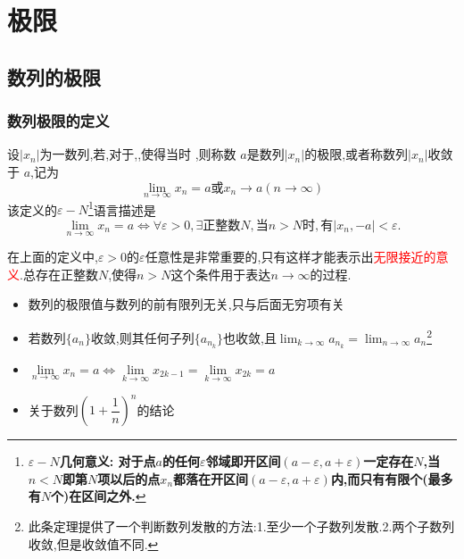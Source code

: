 \documentclass[10pt, a4paper, oneside, UTF8]{ctexbook}
\begin{document}
\begin{sloppypar}
    \else
    \fi
    \chapter{极限}
    \section{数列的极限}
    \subsection{数列极限的定义}
    \begin{defn}{}{}
        设$|x_n|$为一数列,若,对于,,使得当时 ,则称数 $a$是数列$| x_n |$的极限,或者称数列$| x_n |$收敛于 $a$,记为
        $$
            \lim_{n\to\infty}x_n=a\text{或}x_n\to a(n\to\infty)
        $$
        该定义的$\varepsilon-N$\footnote{$\varepsilon - N$\textbf{几何意义: 对于点$a$的任何$\varepsilon$邻域即开区间$(a-\varepsilon,a+\varepsilon)$一定存在$N$,当$n < N$即第$N$项以后的点$x_n$都落在开区间$(a-\varepsilon,a+\varepsilon)$内,而只有有限个(最多有$N$个)在区间之外.}}语言描述是
        \newline
        $$\lim_{n\to\infty}x_n=a\Leftrightarrow\forall\varepsilon>0,\exists\text{正整数}N,\text{当}n>N\text{时},\text{有}|x_n,-a|<\varepsilon.$$
    \end{defn}
    在上面的定义中,$\varepsilon>0$的$\varepsilon$任意性是非常重要的,只有这样才能表示出\textcolor{red}{无限接近的意义}.总存在正整数$N$,使得$n>N$这个条件用于表达$n \to \infty$的过程.
    \begin{criterion}{}{}
        \begin{itemize}
            \item 数列的极限值与数列的前有限列无关,只与后面无穷项有关
            \item 若数列$\{a_n\}$收敛,则其任何子列$\{a_{n_k}\}$也收敛,且$\lim_{k\to\infty}a_{n_k}=\lim_{n\to\infty}a_n$\footnote{ 此条定理提供了一个判断数列发散的方法:1.至少一个子数列发散.2.两个子数列收敛,但是收敛值不同.}
            \item $\underset{n\to\infty}{\operatorname*{\lim}}x_n=a\Leftrightarrow\underset{k\to\infty}{\operatorname*{\lim}}x_{2k-1}=\underset{k\to\infty}{\operatorname*{\lim}}x_{2k}=a$
            \item 关于数列$(1+\dfrac{1}{n})^n$的结论

\end{itemize}
\end{criterion}
\end{sloppypar}
\end{document}
